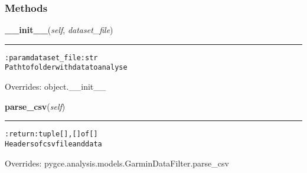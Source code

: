   \subsubsection{Methods}

    \vspace{0.5ex}

\hspace{.8\funcindent}\begin{boxedminipage}{\funcwidth}

    \raggedright \textbf{\_\_init\_\_}(\textit{self}, \textit{dataset\_file})

    \vspace{-1.5ex}

    \rule{\textwidth}{0.5\fboxrule}
\setlength{\parskip}{2ex}
\begin{alltt}

:param dataset\_file: str
    Path to folder with data to analyse
\end{alltt}

\setlength{\parskip}{1ex}
      Overrides: object.\_\_init\_\_

    \end{boxedminipage}

    \vspace{0.5ex}

\hspace{.8\funcindent}\begin{boxedminipage}{\funcwidth}

    \raggedright \textbf{parse\_csv}(\textit{self})

    \vspace{-1.5ex}

    \rule{\textwidth}{0.5\fboxrule}
\setlength{\parskip}{2ex}
\begin{alltt}

:return: tuple [], [] of []
    Headers of csv file and data
\end{alltt}

\setlength{\parskip}{1ex}
      Overrides: pygce.analysis.models.GarminDataFilter.parse\_csv

    \end{boxedminipage}

    \label{pygce:analysis:models:ActivitiesDataAnalysis:shows_correlation_matrix_of_data}

